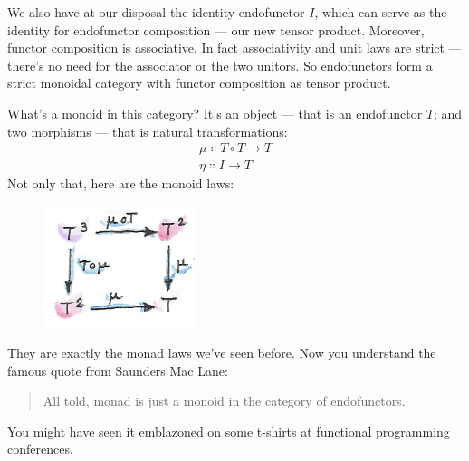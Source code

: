 \noindent
We also have at our disposal the identity endofunctor $I$, which
can serve as the identity for endofunctor composition --- our new tensor
product. Moreover, functor composition is associative. In fact
associativity and unit laws are strict --- there's no need for the
associator or the two unitors. So endofunctors form a strict monoidal
category with functor composition as tensor product.

What's a monoid in this category? It's an object --- that is an
endofunctor $T$; and two morphisms --- that is natural
transformations:
\begin{gather*}
\mu \Colon T \circ T \to T \\
\eta \Colon I \to T
\end{gather*}
Not only that, here are the monoid laws:

\begin{figure}[H]
\centering
\includegraphics[width=0.4\textwidth]{images/assoc.png}
\end{figure}

\begin{figure}[H]
\centering
{}
\end{figure}

\noindent
They are exactly the monad laws we've seen before. Now you understand
the famous quote from Saunders Mac Lane:

\begin{quote}
All told, monad is just a monoid in the category of endofunctors.
\end{quote}
You might have seen it emblazoned on some t-shirts at functional
programming conferences.

